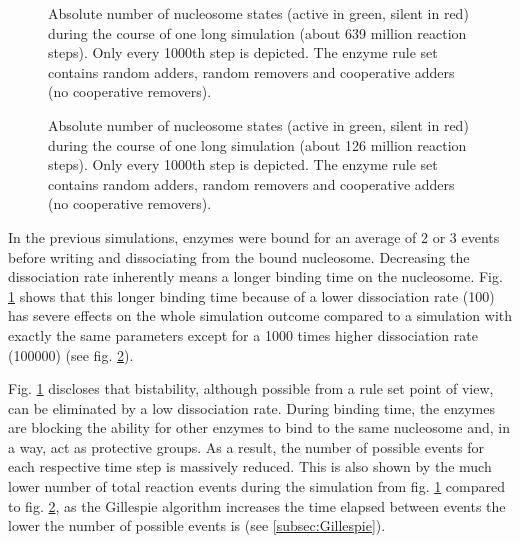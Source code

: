        \begin{figure}[htpb!]
            \centering
            \caption{Absolute number of nucleosome states (active in green, silent in red) during the course of one long simulation (about 639 million reaction steps). Only every 1000th step is depicted. The enzyme rule set contains random adders, random removers and cooperative adders (no cooperative removers).}
            \label{img:dissoc_runPlot1}
        \end{figure}

        \begin{figure}[htpb!]
            \centering
            \caption{Absolute number of nucleosome states (active in green, silent in red) during the course of one long simulation (about 126 million reaction steps). Only every 1000th step is depicted. The enzyme rule set contains random adders, random removers and cooperative adders (no cooperative removers).}
            \label{img:dissoc_runPlot2}
        \end{figure}

        In the previous simulations, enzymes were bound for an average of 2 or 3 events before writing and dissociating from the bound nucleosome. Decreasing the dissociation rate inherently means a longer binding time on the nucleosome. Fig. \ref{img:dissoc_runPlot1} shows that this longer binding time because of a lower dissociation rate (100) has severe effects on the whole simulation outcome compared to a simulation with exactly the same parameters except for a 1000 times higher dissociation rate (100000) (see fig. \ref{img:dissoc_runPlot2}).

        Fig. \ref{img:dissoc_runPlot1} discloses that bistability, although possible from a rule set point of view, can be eliminated by a low dissociation rate. During binding time, the enzymes are blocking the ability for other enzymes to bind to the same nucleosome and, in a way, act as protective groups. As a result, the number of possible events for each respective time step is massively reduced. This is also shown by the much lower number of total reaction events during the simulation from fig. \ref{img:dissoc_runPlot1} compared to fig. \ref{img:dissoc_runPlot2}, as the Gillespie algorithm increases the time elapsed between events the lower the number of possible events is (see \ref{subsec:Gillespie}).

